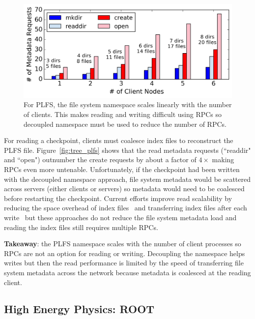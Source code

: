 \begin{figure}[tb]
\centering
  \includegraphics[width=1\linewidth]{figures/plfs_problem.png} 
  \caption{For PLFS, the file system  namespace scales linearly with the number
of clients.  This makes reading and writing difficult using RPCs so decoupled
namespace must be used to reduce the number of RPCs.  }\label{fig:plfs_problem}
\end{figure}

For reading a checkpoint, clients must coalesce index files to reconstruct the
PLFS file. Figure~\ref{fig:tree_plfs} shows that the read metadata requests
(``readdir" and ``open") outnumber the create requests by about a factor of
\(4\times\) making RPCs even more untenable. Unfortunately, if the checkpoint
had been written with the decoupled namespace approach, file system metadata
would be scattered across servers (either clients or servers) so metadata would
need to be coalesced before restarting the checkpoint.  Current efforts improve
read scalability by reducing the space overhead of index
files~\cite{he:hpdc13-plfs-patterns} and transferring index files after each
write~\cite{grider:pc17-diddlings} but these approaches do not reduce the file
system metadata load and reading the index files still requires multiple RPCs.

\textbf{Takeaway}: the PLFS namespace scales with the number of client
processes so RPCs are not an option for reading or writing.  Decoupling the
namespace helps writes but then the read performance is limited by the speed of
transferring file system metadata across the network because metadata is
coalesced at the reading client.

\subsection{High Energy Physics: ROOT}


